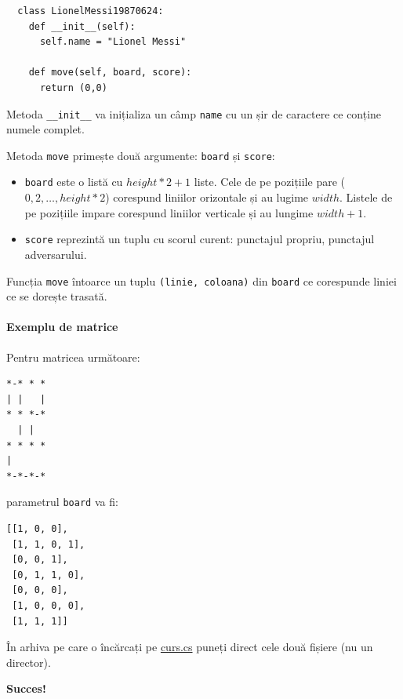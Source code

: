 \documentclass[12pt]{article}
\begin{document}
\begin{verbatim}
  class LionelMessi19870624:
    def __init__(self):
      self.name = "Lionel Messi"

    def move(self, board, score):
      return (0,0)
\end{verbatim}

Metoda \texttt{\_\_init\_\_} va inițializa un câmp \texttt{name} cu un șir
de caractere ce conține numele complet.

Metoda \texttt{move} primește două argumente: \texttt{board} și \texttt{score}:
\begin{itemize}
\item \texttt{board} este o listă cu $height * 2 + 1$ liste. Cele de
  pe pozițiile pare ($0, 2, \ldots, height * 2$) corespund liniilor
  orizontale și au lugime $width$. Listele de pe pozițiile impare
  corespund liniilor verticale și au lungime $width + 1$.
\item \texttt{score} reprezintă un tuplu cu scorul curent: punctajul
  propriu, punctajul adversarului.
\end{itemize}
Funcția \texttt{move} întoarce un tuplu \texttt{(linie, coloana)} din
\texttt{board} ce corespunde liniei ce se dorește trasată.

\paragraph{Exemplu de matrice}

Pentru matricea următoare:
\begin{verbatim}
*-* * *
| |   |
* * *-*
  | |  
* * * *
|      
*-*-*-*
\end{verbatim}
parametrul \texttt{board} va fi:
\begin{verbatim}
[[1, 0, 0],
 [1, 1, 0, 1],
 [0, 0, 1],
 [0, 1, 1, 0],
 [0, 0, 0],
 [1, 0, 0, 0],
 [1, 1, 1]]
\end{verbatim}

În arhiva pe care o încărcați pe \url{curs.cs} puneți direct cele două
fișiere (nu un director).

\textbf{Succes!}
\end{document}
